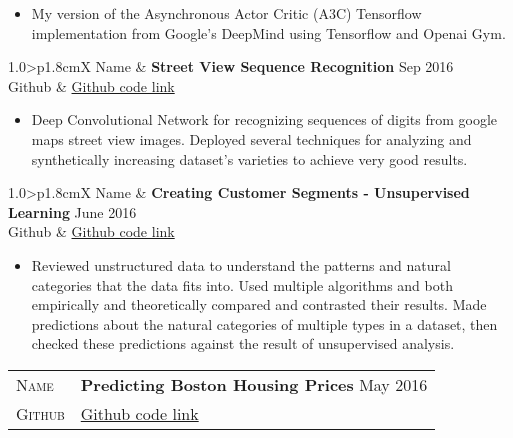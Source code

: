 \documentclass[10pt, a4paper, oneside, final]{scrartcl} %
\newcommand{\gray}{\rowcolor[gray]{.90}} %
\begin{document}
\begin{itemize}\itemsep1.5pt
\item My version of the Asynchronous Actor Critic (A3C) Tensorflow implementation from Google's DeepMind using Tensorflow and Openai Gym.
\end{itemize}

\begin{center}
\begin{tabularx}{1.0\linewidth}{>{\raggedleft\scshape}p{1.8cm}X}
\gray Name & \textbf{Street View Sequence Recognition} \hfill Sep 2016\\
\gray Github & \href{https://github.com/thalles753/machine-learning/tree/master/projects/capstone/sequence_recognition}{Github code link}
\end{tabularx}
\end{center}

\begin{itemize}\itemsep1.5pt
\item Deep Convolutional Network for recognizing sequences of digits from google maps street view images. Deployed several techniques for analyzing and synthetically increasing dataset's varieties to achieve very good results.
\end{itemize}

\begin{center}
\begin{tabularx}{1.0\linewidth}{>{\raggedleft\scshape}p{1.8cm}X}
\gray Name & \textbf{Creating Customer Segments - Unsupervised Learning} \hfill June 2016\\
\gray Github & \href{https://github.com/thalles753/machine-learning/tree/master/projects/creating_customer_segments}{Github code link}
\end{tabularx}
\end{center}

\begin{itemize}\itemsep1.5pt
\item Reviewed unstructured data to understand the patterns and natural categories that the data fits into.
Used multiple algorithms and both empirically and theoretically compared and contrasted their results.
Made predictions about the natural categories of multiple types in a dataset, then checked these
predictions against the result of unsupervised analysis.
\end{itemize}

\begin{center}
\begin{tabularx}{1.0\linewidth}{>{\raggedleft\scshape}p{1.8cm}X}
\gray Name & \textbf{Predicting Boston Housing Prices} \hfill May 2016\\
\gray Github & \href{https://github.com/thalles753/machine-learning/tree/master/projects/boston_housing}{Github code link}
\end{tabularx}
\end{center}
\end{document}

